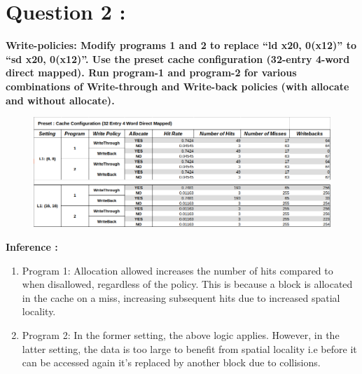 \documentclass{article}
\begin{document}
\section{Question 2 :}
\textbf{\large{
Write-policies: Modify programs 1 and 2 to replace “ld x20, 0(x12)” to “sd x20, 0(x12)”. Use the preset cache configuration (32-entry 4-word direct mapped). Run program-1 and program-2 for various combinations of Write-through and Write-back policies (with allocate and without allocate).
}}
\begin{figure}[H]
  \centering
  \includegraphics[width=1\textwidth]{2.png}
  \label{fig:example}
\end{figure}
\noindent
\textbf{\large{Inference :}}\\
\begin{enumerate}[label=\alph*)]
  \item Program 1: Allocation allowed increases the number of hits compared to when disallowed, regardless of the policy. This is because a block is allocated in the cache on a miss, increasing subsequent hits due to increased spatial locality.
  \item Program 2: In the former setting, the above logic applies. However, in the latter setting, the data is too large to benefit from spatial locality i.e before it can be accessed again it's replaced by another block due to collisions.
\end{enumerate}
\smallskip
\end{document}
